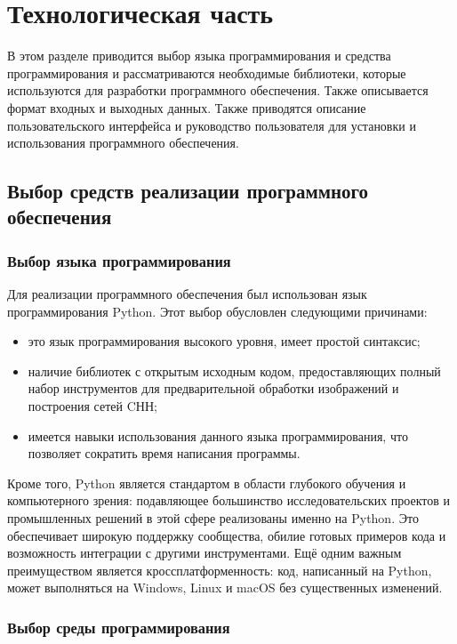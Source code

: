 \chapter{Технологическая часть}

В этом разделе приводится выбор языка программирования и средства программирования и рассматриваются необходимые библиотеки, которые используются для разработки программного обеспечения. Также описывается формат входных и выходных данных. Также приводятся описание пользовательского интерфейса и руководство пользователя для установки и использования программного обеспечения.

\section{Выбор средств реализации программного обеспечения}

\subsection{Выбор языка программирования}

Для реализации программного обеспечения был использован язык программирования Python\cite{python}. Этот выбор обусловлен следующими причинами:

\begin{itemize}[label = ---]
	\item это язык программирования высокого уровня, имеет простой синтаксис;
	\item наличие библиотек с открытым исходным кодом, предоставляющих полный набор инструментов для предварительной обработки изображений и построения сетей CНН;
	\item имеется навыки использования данного языка программирования, что позволяет сократить время написания программы.
\end{itemize}

Кроме того, Python является стандартом в области глубокого обучения и компьютерного зрения: подавляющее большинство исследовательских проектов и промышленных решений в этой сфере реализованы именно на Python. Это обеспечивает широкую поддержку сообщества, обилие готовых примеров кода и возможность интеграции с другими инструментами. Ещё одним важным преимуществом является кроссплатформенность: код, написанный на Python, может выполняться на Windows, Linux и macOS без существенных изменений.

\subsection{Выбор среды программирования}

